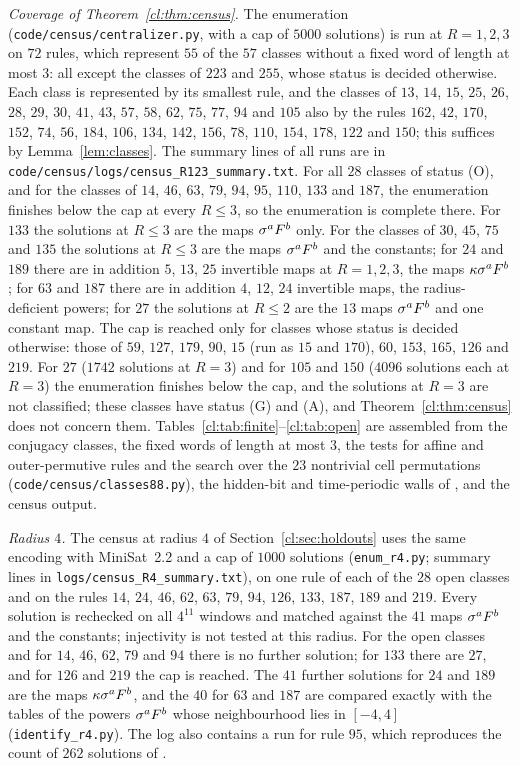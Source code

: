 \emph{Coverage of Theorem~\ref{cl:thm:census}.} The enumeration (\texttt{code/census/centralizer.py}, with a cap of $5000$ solutions) is run at $R=1,2,3$ on $72$ rules, which represent $55$ of the $57$ classes without a fixed word of length at most $3$: all except the classes of $223$ and $255$, whose status is decided otherwise. Each class is represented by its smallest rule, and the classes of $13$, $14$, $15$, $25$, $26$, $28$, $29$, $30$, $41$, $43$, $57$, $58$, $62$, $75$, $77$, $94$ and $105$ also by the rules $162$, $42$, $170$, $152$, $74$, $56$, $184$, $106$, $134$, $142$, $156$, $78$, $110$, $154$, $178$, $122$ and $150$; this suffices by Lemma~\ref{lem:classes}. The summary lines of all runs are in \texttt{code/census/logs/census\_R123\_summary.txt}. For all $28$ classes of status (O), and for the classes of $14$, $46$, $63$, $79$, $94$, $95$, $110$, $133$ and $187$, the enumeration finishes below the cap at every $R\le3$, so the enumeration is complete there. For $133$ the solutions at $R\le3$ are the maps $\sigma^aF^b$ only. For the classes of $30$, $45$, $75$ and $135$ the solutions at $R\le3$ are the maps $\sigma^aF^b$ and the constants; for $24$ and $189$ there are in addition $5$, $13$, $25$ invertible maps at $R=1,2,3$, the maps $\kappa\sigma^aF^b$; for $63$ and $187$ there are in addition $4$, $12$, $24$ invertible maps, the radius-deficient powers; for $27$ the solutions at $R\le2$ are the $13$ maps $\sigma^aF^b$ and one constant map. The cap is reached only for classes whose status is decided otherwise: those of $59$, $127$, $179$, $90$, $15$ (run as $15$ and $170$), $60$, $153$, $165$, $126$ and $219$. For $27$ ($1742$ solutions at $R=3$) and for $105$ and $150$ ($4096$ solutions each at $R=3$) the enumeration finishes below the cap, and the solutions at $R=3$ are not classified; these classes have status (G) and (A), and Theorem~\ref{cl:thm:census} does not concern them. Tables~\ref{cl:tab:finite}--\ref{cl:tab:open} are assembled from the conjugacy classes, the fixed words of length at most $3$, the tests for affine and outer-permutive rules and the search over the $23$ nontrivial cell permutations (\texttt{code/census/classes88.py}), the hidden-bit and time-periodic walls of \cite{PaperC}, and the census output.

\emph{Radius $4$.} The census at radius $4$ of Section~\ref{cl:sec:holdouts} uses the same encoding with MiniSat~2.2 and a cap of $1000$ solutions (\texttt{enum\_r4.py}; summary lines in \texttt{logs/census\_R4\_summary.txt}), on one rule of each of the $28$ open classes and on the rules $14$, $24$, $46$, $62$, $63$, $79$, $94$, $126$, $133$, $187$, $189$ and $219$. Every solution is rechecked on all $4^{11}$ windows and matched against the $41$ maps $\sigma^aF^b$ and the constants; injectivity is not tested at this radius. For the open classes and for $14$, $46$, $62$, $79$ and $94$ there is no further solution; for $133$ there are $27$, and for $126$ and $219$ the cap is reached. The $41$ further solutions for $24$ and $189$ are the maps $\kappa\sigma^aF^b$, and the $40$ for $63$ and $187$ are compared exactly with the tables of the powers $\sigma^aF^b$ whose neighbourhood lies in $[-4,4]$ (\texttt{identify\_r4.py}). The log also contains a run for rule $95$, which reproduces the count of $262$ solutions of \cite[Lemma~6.20]{PaperE}.

